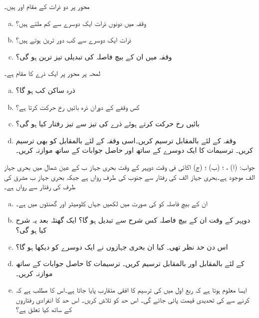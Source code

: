  محور پر دو ذرات کے مقام  اور  ہیں۔
\begin{enumerate}[a.]
\item
وقفہ  میں دونوں ذرات ایک دوسرے سے کم ملتے ہیں؟
\item
ذرات ایک دوسرے سے کب دور ترین ہوتے ہیں؟
\item
وقفہ  میں ان کے بیچ فاصلہ کی تبدیلی تیز ترین ہو گی؟
\end{enumerate}
لمحہ  پر  محور پر ایک ذرے کا مقام  ہے۔
\begin{enumerate}[a.]
\item
ذرہ ساکن کب ہو گا؟
\item
کس وقفے کے دوران ذرہ بائیں رخ حرکت کرتا ہے؟
\item
بائیں رخ حرکت کرتے ہوئے ذرے کی تیز سے تیز رفتار کیا ہو گی؟
\item
وقفہ  کے لئے  بالمقابل  ترسیم کریں۔اسی وقفہ کے لئے  بالمقابل  کو بھی ترسیم کریں۔ ترسیمات کا ایک دوسرے کے ساتھ اور حاصل جوابات کے ساتھ موازنہ کریں۔
\end{enumerate}
جواب:\quad
(ا) ، ؛ (ب) ؛ (ج)  اکائی فی وقت
دوپہر کے وقت   بحری جہاز ب کے عین شمال میں بحری جہاز الف موجود ہے۔بحری جہاز الف  کی رفتار سے جنوب کی طرف رواں ہے جبکہ بحری جہاز ب مشرق کی طرف  کی رفتار سے رواں ہے۔
\begin{enumerate}[a.]
\item
ان کے بیچ فاصلہ  کو  کی صورت میں لکھیں جہاں  کلومیٹر اور  گھنٹوں میں ہے۔
\item
دوپہر کے وقت ان کے بیچ فاصلہ کس شرح سے تبدیل ہو گا؟ ایک گھنٹہ بعد یہ شرح کیا ہو گی؟
\item
اس دن حد نظر  تھی۔ کیا ان بحری جہازوں نے ایک دوسرے کو دیکھا ہو گا؟ 
\item
{} کے لئے  بالمقابل  اور  بالمقابل  ترسیم کریں۔ ترسیمات کا حاصل جوابات کے ساتھ موازنہ کریں۔
\item
ایسا معلوم ہوتا ہے کہ ربع اول میں  کی ترسیم کا افقی متقارب پایا جاتا ہے۔اس کا مطلب ہے  کہ  کرنے سے  کی تحدیدی قیمت پائی جائے گی۔ اس حد کو تلاش کریں۔ اس حد کا انفرادی رفتاروں کے ساتھ کیا تعلق ہے؟
\end{enumerate}
